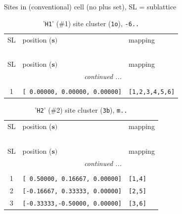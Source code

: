 \documentclass[fleqn,10pt,landscape]{jsarticle}
\begin{document}
\noindent Sites in (conventional) cell (no plus set), SL = sublattice

\renewcommand{\arraystretch}{1.6}
\begin{longtable}[l]{cll}
\captionsetup{justification=raggedright, singlelinecheck=off}
\caption{'\texttt{H1}' (\#1) site cluster (\texttt{1o}), \texttt{-6..}}
 \\
 \hline \hline
SL & position ($\bm{s})$ & mapping \\ \hline \endfirsthead

\multicolumn{2}{l}{\tablename\ \thetable{}} \\
 \hline \hline
SL & position ($\bm{s})$ & mapping \\ \hline \endhead

 \hline \hline
\multicolumn{2}{r}{\footnotesize\it continued ...} \\ \endfoot

 \hline \hline
\multicolumn{2}{r}{} \\ \endlastfoot

1 & \texttt{[ 0.00000, 0.00000, 0.00000]} & \texttt{[1,2,3,4,5,6]} \\
\end{longtable}
\renewcommand{\arraystretch}{1.6}
\begin{longtable}[l]{cll}
\captionsetup{justification=raggedright, singlelinecheck=off}
\caption{'\texttt{H2}' (\#2) site cluster (\texttt{3b}), \texttt{m..}}
 \\
 \hline \hline
SL & position ($\bm{s})$ & mapping \\ \hline \endfirsthead

\multicolumn{2}{l}{\tablename\ \thetable{}} \\
 \hline \hline
SL & position ($\bm{s})$ & mapping \\ \hline \endhead

 \hline \hline
\multicolumn{2}{r}{\footnotesize\it continued ...} \\ \endfoot

 \hline \hline
\multicolumn{2}{r}{} \\ \endlastfoot

1 & \texttt{[ 0.50000, 0.16667, 0.00000]} & \texttt{[1,4]} \\ \hline
2 & \texttt{[-0.16667, 0.33333, 0.00000]} & \texttt{[2,5]} \\ \hline
3 & \texttt{[-0.33333,-0.50000, 0.00000]} & \texttt{[3,6]} \\
\end{longtable}
\renewcommand{\arraystretch}{1.6}
\end{document}
